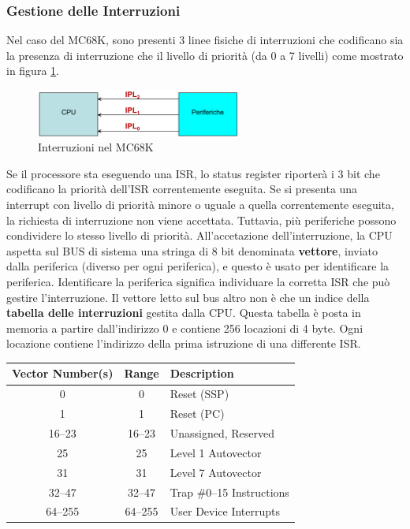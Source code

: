 \subsubsection{Gestione delle Interruzioni}
Nel caso del MC68K, sono presenti 3 linee fisiche di interruzioni che codificano sia la presenza di interruzione che il livello di priorità (da 0 a 7 livelli) come mostrato in figura \ref{fig:interr_mc68k}. 

\begin{figure}[ht]
    \centering
    \includegraphics[width=0.6\textwidth]{img/interr.png}
    \caption{Interruzioni nel MC68K}
    \label{fig:interr_mc68k}
\end{figure}

Se il processore sta eseguendo una ISR, lo status register riporterà i 3 bit che codificano la priorità dell'ISR correntemente eseguita. Se si presenta una interrupt con livello di priorità minore o uguale a quella correntemente eseguita, la richiesta di interruzione non viene accettata. Tuttavia, più periferiche possono condividere lo stesso livello di priorità. All'accetazione dell'interruzione, la CPU aspetta sul BUS di sistema una stringa di 8 bit denominata \textbf{vettore}, inviato dalla periferica (diverso per ogni periferica), e questo è usato per identificare la periferica. Identificare la periferica significa individuare la corretta ISR che può gestire l'interruzione. Il vettore letto sul bus altro non è che un indice della \textbf{tabella delle interruzioni} gestita dalla CPU. Questa tabella è posta in memoria a partire dall'indirizzo 0 e contiene 256 locazioni di 4 byte. Ogni locazione contiene l'indirizzo della prima istruzione di una differente ISR.

\begin{table}[h!]
\centering
\begin{tabular}{|c|c|l|}
\hline
\textbf{Vector Number(s)} & \textbf{Range} & \textbf{Description} \\ \hline
0                         & 0              & Reset (SSP) \\ \hline
1                         & 1              & Reset (PC) \\ \hline
16--23                    & 16--23         & Unassigned, Reserved \\ \hline
25                        & 25             & Level 1 Autovector \\ \hline
31                        & 31             & Level 7 Autovector \\ \hline
32--47                    & 32--47         & Trap \#0--15 Instructions \\ \hline
64--255                   & 64--255        & User Device Interrupts \\ \hline
\end{tabular}
\end{table}

